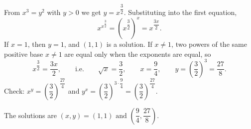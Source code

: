 From $x^3=y^2$ with $y>0$ we get $y=x^{\dfrac32}$. Substituting into the first equation,
\[x^{x^{\dfrac32}}=\left(x^{\dfrac32}\right)^x=x^{\dfrac{3x}{2}}.\]
If $x=1$, then $y=1$, and $(1,1)$ is a solution. If $x\ne1$, two powers of the same positive base $x\ne1$ are equal only when the exponents are equal, so
\[x^{\dfrac32}=\dfrac{3x}{2},\qquad\text{i.e.}\qquad\sqrt x=\dfrac32,\qquad x=\dfrac94,\qquad y=\left(\dfrac32\right)^3=\dfrac{27}{8}.\]
Check: $x^y=\left(\dfrac32\right)^{\dfrac{27}{4}}$ and $y^x=\left(\dfrac32\right)^{3\cdot\dfrac94}=\left(\dfrac32\right)^{\dfrac{27}{4}}$.

The solutions are $\boxed{(x,y)=(1,1)\text{ and }\left(\dfrac94,\dfrac{27}{8}\right)}$.
